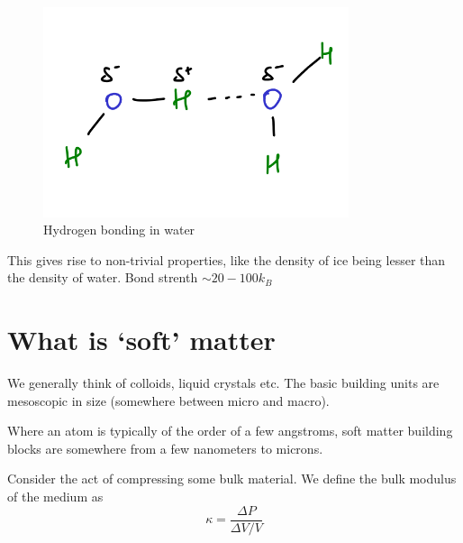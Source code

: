 \documentclass[a4paper]{article}
\begin{document}
\begin{figure}[h]
	\centering
	\includegraphics[width=0.8\textwidth]{figures/hydrogen.png}
	\caption{Hydrogen bonding in water}
	\label{fig:figures-hydrogen-png}
\end{figure}

This gives rise to non-trivial properties, like the density of ice
being lesser than the density of water. Bond strenth $\sim 20 - 100 k_B$

\section*{What is `soft' matter}
We generally think of colloids, liquid crystals etc. The basic
building units are mesoscopic in size (somewhere between micro and macro).

Where an atom is typically of the order of a few angstroms, soft matter
building blocks are somewhere from a few nanometers to microns.

Consider the act of compressing some bulk material. We define the
bulk modulus of the medium as 
\begin{equation}\label{bulk}
	\kappa = \frac{\Delta P}{\Delta V/V}
\end{equation}
\end{document}
